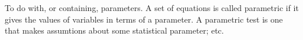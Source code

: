 To do with, or containing, parameters. A set of equations is
called parametric if it gives the values of variables in terms of
a parameter. A parametric test is one that makes assumtions about
some statistical parameter; etc.